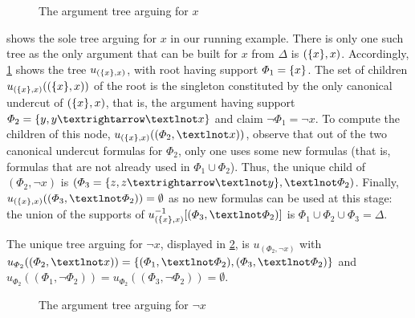 \documentclass[version=3.21, pagesize, twoside=off, bibliography=totoc, DIV=calc, fontsize=12pt, a4paper, french, english]{scrartcl}
\begin{document}
\begin{figure}
	\caption{The argument tree arguing for $x$}
	\label{fig:utx}
\end{figure}
\begin{example}
	\label{ex:abstUnder}
	 shows the sole tree arguing for $x$ in our running example. There is only one such tree as the only argument that can be built for $x$ from $\Delta$ is $(\{x\}, x)$. Accordingly, \cref{fig:utx} shows the tree $u_{(\{x\}, x)}$, with root having support $\Phi_1 = \{x\}$. The set of children $u_{(\{x\}, x)}((\{x\}, x))$ of the root is the singleton constituted by the only canonical undercut of $(\{x\}, x)$, that is, the argument having support $\Phi_2 = \set{y, y → ¬x}$ and claim $¬\Phi_1 = ¬x$. 
	To compute the children of this node, $u_{(\set{x}, x)}((\Phi_2, ¬x))$, observe that out of the two canonical undercut formulas for $\Phi_2$, only one uses some new formulas (that is, formulas that are not already used in $\Phi_1 \cup \Phi_2$). Thus, the unique child of $(\Phi_2, ¬x)$ is $(\Phi_3 = \set{z, z → ¬y}, ¬\Phi_2)$. 
	Finally, $u_{(\set{x}, x)}((\Phi_3, ¬\Phi_2)) = \emptyset$ as no new formulas can be used at this stage: the union of the supports of $u_{(\set{x}, x)}^{-1}[(\Phi_3, ¬\Phi_2)]$ is $\Phi_1 \cup \Phi_2 \cup \Phi_3 = \Delta$.
	
	The unique tree arguing for $¬x$, displayed in \cref{fig:utnx}, is $u_{(\Phi_2, ¬x)}$ with $u_{\Phi_2}((\Phi_2, ¬x)) = \set{(\Phi_1, ¬\Phi_2), (\Phi_3, ¬\Phi_2)}$ and $u_{\Phi_2}((\Phi_1, ¬\Phi_2)) = u_{\Phi_2}((\Phi_3, ¬\Phi_2)) = \emptyset$.
\end{example}
\begin{figure}
	\caption{The argument tree arguing for $¬x$}
	\label{fig:utnx}
\end{figure}
\end{document}
